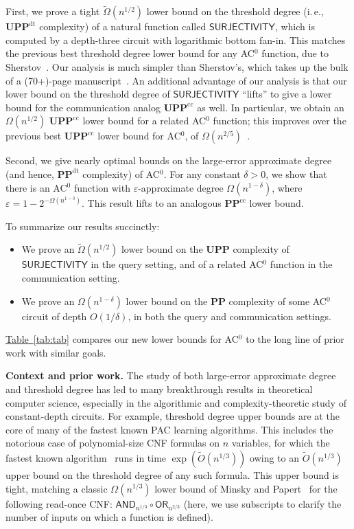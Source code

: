 \documentclass[11pt]{article}
\numberwithin{equation}{section}
\theoremstyle{definition}
\theoremstyle{plain}
\newcommand{\ie}{i.\,e.}
\newcommand{\expref}[2]{\hyperref[#2]{#1~\ref{#2}}}
\newcommand{\OR}{\mathsf{ OR}}
\newcommand{\PP}{\mathbf{PP}}
\newcommand{\UPP}{\mathbf{UPP}}
\newcommand{\eps}{\varepsilon}
\newcommand{\AND}{\mathsf{AND}}
\begin{document}
First, we prove a tight $\tilde{\Omega}(n^{1/2})$ lower bound
on the threshold degree (\ie,  $\UPP^{\text{dt}}$ complexity) of a natural function called $\mathsf{SURJECTIVITY}$,
which is computed by a depth-three %
circuit with logarithmic bottom fan-in.
This matches the previous best threshold degree lower bound for any AC$^0$
function, due to Sherstov~\cite{sherstov15}. Our analysis is 
much simpler than
Sherstov's, which takes up the bulk of a (70+)-page manuscript~\cite{sherstov15}.
%
An additional advantage of our analysis is that our lower bound on the threshold degree of $\mathsf{SURJECTIVITY}$ ``lifts'' to give a lower bound for the communication analog  $\UPP^{\text{cc}}$ as well.
In particular, we obtain an $\Omega(n^{1/2})$ 
$\UPP^{\text{cc}}$
lower bound for a related AC$^0$ function; this improves over the previous best $\UPP^{\text{cc}}$
lower bound for AC$^0$, of $\Omega(n^{2/5})$~\cite{bt16}. 

Second, we give nearly optimal bounds on the large-error approximate degree (and hence, $\PP^{\text{dt}}$ complexity) of AC$^0$. For any constant $\delta > 0$, we show that there is an AC$^0$ function with $\eps$-approximate degree
$\Omega(n^{1-\delta})$, where $\eps=1-2^{-\Omega(n^{1-\delta})}$. This result lifts to an analogous $\PP^{\text{cc}}$ lower bound. 

To summarize our results succinctly:
\begin{itemize}
	\item We prove an $\tilde{\Omega}(n^{1/2})$ lower bound on the $\UPP$ complexity of $\mathsf{SURJECTIVITY}$ in the query setting,
	and of a related AC$^0$ function in the communication setting.
	\item We prove an $\Omega(n^{1-\delta})$ lower bound on the $\PP$ complexity of some AC$^0$ circuit of depth $O(1/\delta)$, in both the query and communication settings.
\end{itemize}

\expref{Table}{tab:tab} compares our new lower bounds for AC$^0$ to the long line of prior %
work   %
with similar goals.




\medskip \noindent \textbf{Context and prior work.}
The study of both large-error approximate degree and threshold degree
has led to many breakthrough results in theoretical computer science,
especially in the algorithmic and complexity-theoretic study of
constant-depth %
circuits.
For example, threshold degree upper bounds are at the core of many of the fastest known PAC learning algorithms.
This includes the notorious case of polynomial-size %
CNF formulas on $n$ variables, for which the fastest known algorithm~\cite{ksdnf} runs in time $\exp(\tilde{O}(n^{1/3}))$
owing to an $\tilde{O}(n^{1/3})$ upper bound on the threshold degree of any such formula. This upper bound \label{sec:MP}
is tight, matching a classic $\Omega(n^{1/3})$ lower bound of Minsky and Papert~\cite{mp} for the following read-once CNF:
$\AND_{n^{1/3}} \circ \OR_{n^{2/3}}$ (here, we use \label{s:footyfootfoot}
subscripts to clarify the number of inputs on which a function is defined). 
\end{document}
